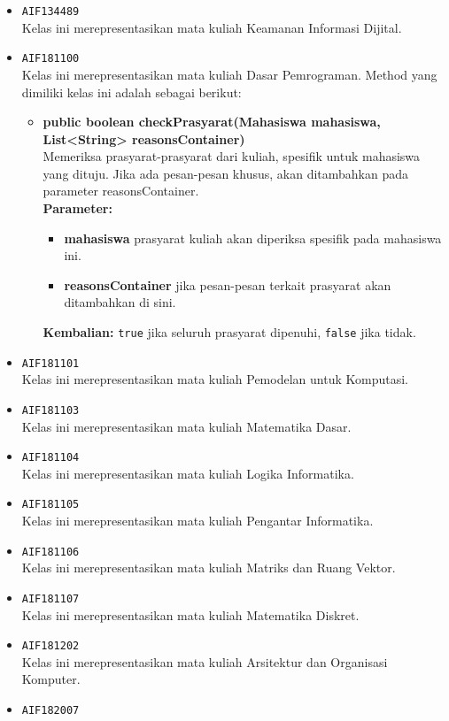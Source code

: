 \begin{enumerate}
\begin{itemize}
\item \texttt{AIF134489} \\
Kelas ini merepresentasikan mata kuliah Keamanan Informasi Dijital.
\item \texttt{AIF181100} \\
Kelas ini merepresentasikan mata kuliah Dasar Pemrograman. Method yang dimiliki kelas ini adalah sebagai berikut: 
\begin{itemize}
\item \textbf{public boolean checkPrasyarat(Mahasiswa mahasiswa, List<String> reasonsContainer)}\\
Memeriksa prasyarat-prasyarat dari kuliah, spesifik untuk mahasiswa yang dituju. Jika ada pesan-pesan khusus, akan ditambahkan pada parameter reasonsContainer.\\
\textbf{Parameter:}
\begin{itemize}
\item \textbf{mahasiswa} prasyarat kuliah akan diperiksa spesifik pada mahasiswa ini.
\item \textbf{reasonsContainer} jika pesan-pesan terkait prasyarat akan ditambahkan di sini.
\end{itemize}
\textbf{Kembalian:} \texttt{true} jika seluruh prasyarat dipenuhi, \texttt{false} jika tidak.
\end{itemize}
\item \texttt{AIF181101} \\
Kelas ini merepresentasikan mata kuliah Pemodelan untuk Komputasi.
\item \texttt{AIF181103} \\
Kelas ini merepresentasikan mata kuliah Matematika Dasar.
\item \texttt{AIF181104} \\
Kelas ini merepresentasikan mata kuliah Logika Informatika.
\item \texttt{AIF181105} \\
Kelas ini merepresentasikan mata kuliah Pengantar Informatika.
\item \texttt{AIF181106} \\
Kelas ini merepresentasikan mata kuliah Matriks dan Ruang Vektor.
\item \texttt{AIF181107} \\
Kelas ini merepresentasikan mata kuliah Matematika Diskret.
\item \texttt{AIF181202} \\
Kelas ini merepresentasikan mata kuliah Arsitektur dan Organisasi Komputer.
\item \texttt{AIF182007} \\

\end{itemize}
\end{enumerate}
